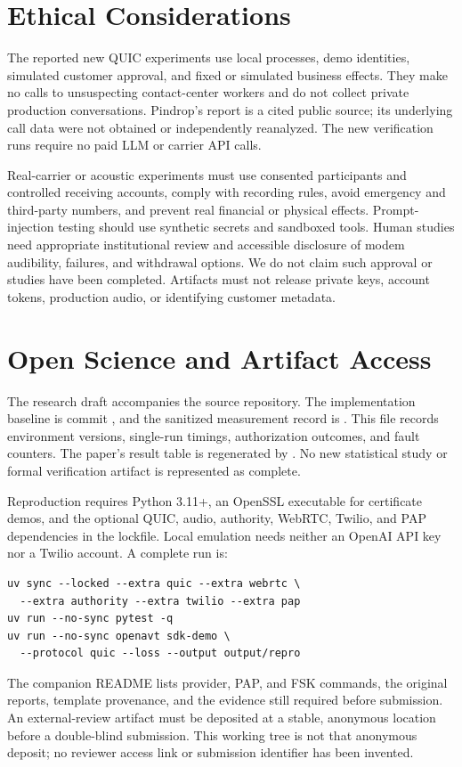 \section{Ethical Considerations}
The reported new QUIC experiments use local processes, demo identities,
simulated customer approval, and fixed or simulated business effects. They
make no calls to unsuspecting contact-center workers and do not collect
private production conversations. Pindrop's report is a cited public source;
its underlying call data were not obtained or independently reanalyzed.
The new verification runs require no paid LLM or carrier API calls.

Real-carrier or acoustic experiments must use consented participants and
controlled receiving accounts, comply with recording rules, avoid emergency
and third-party numbers, and prevent real financial or physical effects.
Prompt-injection testing should use synthetic secrets and sandboxed tools.
Human studies need appropriate institutional review and accessible disclosure
of modem audibility, failures, and withdrawal options. We do not claim such
approval or studies have been completed. Artifacts must not release private
keys, account tokens, production audio, or identifying customer metadata.

\section{Open Science and Artifact Access}
The research draft accompanies the source repository. The implementation
baseline is commit \implementationcommit{}, and the sanitized measurement
record is . This file records environment
versions, single-run timings, authorization outcomes, and fault counters.
The paper's result table is regenerated by
. No new statistical study or formal
verification artifact is represented as complete.

Reproduction requires Python 3.11+, an OpenSSL executable for certificate
demos, and the optional QUIC, audio, authority, WebRTC, Twilio, and PAP
dependencies in the lockfile. Local emulation needs neither an OpenAI API key
nor a Twilio account. A complete run is:
\begin{verbatim}
uv sync --locked --extra quic --extra webrtc \
  --extra authority --extra twilio --extra pap
uv run --no-sync pytest -q
uv run --no-sync openavt sdk-demo \
  --protocol quic --loss --output output/repro
\end{verbatim}
The companion README lists provider, PAP, and FSK commands, the original
reports, template provenance, and the evidence still required before
submission. An external-review artifact must be deposited at a stable,
anonymous location before a double-blind submission. This working tree is
not that anonymous deposit; no reviewer access link or submission identifier
has been invented.

